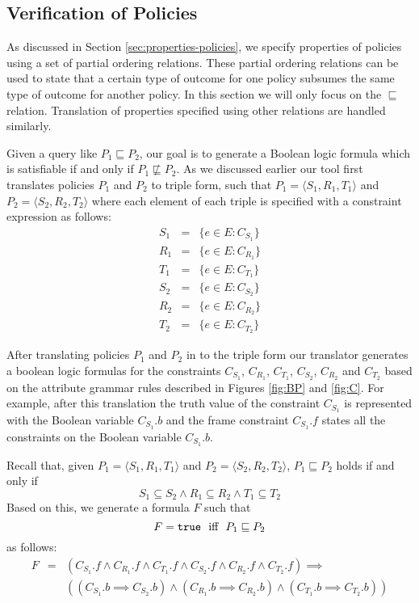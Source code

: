 \subsection{Verification of Policies}

As discussed in Section \ref{sec:properties-policies}, we specify properties
of policies using a set of partial ordering relations. These partial ordering
relations can be used to state that a certain type of outcome
for one policy subsumes the same type of outcome for another policy.
In this section we will only focus on the $\sqsubseteq$ relation.
Translation of properties specified using other relations are handled similarly.

Given a query like $P_1 \sqsubseteq P_2$, our goal is to 
generate a Boolean logic formula which is satisfiable
if and only if $P_1 \not \sqsubseteq P_2$.
As we discussed earlier our tool first translates policies
$P_1$ and $P_2$ to triple form, such that
$P_1 = \langle S_1, R_1, T_1 \rangle$ and 
$P_2 = \langle S_2, R_2, T_2 \rangle$
where each element of each triple is specified with a constraint expression
as follows:
\begin{eqnarray*}
S_1  & = & \{ e \in E : C_{S_1} \} \\
R_1  & = & \{ e \in E : C_{R_1} \} \\
T_1  & = & \{ e \in E : C_{T_1} \} \\
S_2  & = & \{ e \in E : C_{S_2} \} \\
R_2  & = & \{ e \in E : C_{R_2} \} \\
T_2  & = & \{ e \in E : C_{T_2} \}
\end{eqnarray*}

After translating policies $P_1$ and $P_2$ in to the triple form
our translator generates a boolean logic formulas for the constraints
$C_{S_1}$,  $C_{R_1}$,  $C_{T_1}$, $C_{S_2}$, $C_{R_2}$ and $C_{T_2}$
based on the attribute grammar rules described in Figures \ref{fig:BP} and
\ref{fig:C}.
For example, after this translation the truth value of the
constraint $C_{S_1}$ is represented with the Boolean variable
$C_{S_1}.b$ and the frame constraint $C_{S_1}.f$ states all the
constraints on the Boolean variable $C_{S_1}.b$.

Recall that, given $P_1 = \langle S_1, R_1, T_1 \rangle$ and $P_2 =
\langle S_2, R_2, T_2 \rangle$, 
$P_1 \sqsubseteq P_2$ holds if and only if
\[
  S_1 \subseteq S_2
  \wedge R_1 \subseteq R_2 \wedge T_1 \subseteq T_2
\]
Based on this, we generate a formula $F$ such that 
\[
F = \texttt{true} \ \text{ iff } \ P_1 \sqsubseteq P_2
\]
as follows:
\begin{eqnarray*}
F & = & (C_{S_1}.f \wedge C_{R_1}.f \wedge C_{T_1}.f \wedge 
    C_{S_2}.f \wedge C_{R_2}.f \wedge C_{T_2}.f ) \implies \\
  & &   ((C_{S_1}.b \implies C_{S_2}.b) \wedge (C_{R_1}.b \implies C_{R_2}.b)
    \wedge (C_{T_1}.b \implies C_{T_2}.b))
\end{eqnarray*}

